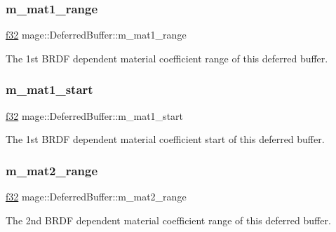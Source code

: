 \subsubsection{\texorpdfstring{m\+\_\+mat1\+\_\+range}{m\_mat1\_range}}
{\footnotesize\ttfamily \hyperlink{namespacemage_a6a44ad388483959dc4dff9f2aef91431}{f32} mage\+::\+Deferred\+Buffer\+::m\+\_\+mat1\+\_\+range}

The 1st B\+R\+DF dependent material coefficient range of this deferred buffer. \hypertarget{structmage_1_1_deferred_buffer_acc1e2286c0c01a7464095d11add4d9ab}{}\label{structmage_1_1_deferred_buffer_acc1e2286c0c01a7464095d11add4d9ab} 
\subsubsection{\texorpdfstring{m\+\_\+mat1\+\_\+start}{m\_mat1\_start}}
{\footnotesize\ttfamily \hyperlink{namespacemage_a6a44ad388483959dc4dff9f2aef91431}{f32} mage\+::\+Deferred\+Buffer\+::m\+\_\+mat1\+\_\+start}

The 1st B\+R\+DF dependent material coefficient start of this deferred buffer. \hypertarget{structmage_1_1_deferred_buffer_a5899e6e83e50bd5a31b61489a19415d0}{}\label{structmage_1_1_deferred_buffer_a5899e6e83e50bd5a31b61489a19415d0} 
\subsubsection{\texorpdfstring{m\+\_\+mat2\+\_\+range}{m\_mat2\_range}}
{\footnotesize\ttfamily \hyperlink{namespacemage_a6a44ad388483959dc4dff9f2aef91431}{f32} mage\+::\+Deferred\+Buffer\+::m\+\_\+mat2\+\_\+range}

The 2nd B\+R\+DF dependent material coefficient range of this deferred buffer. \hypertarget{structmage_1_1_deferred_buffer_ae43c623836d8372be8d8ac40349ac156}{}\label{structmage_1_1_deferred_buffer_ae43c623836d8372be8d8ac40349ac156} 
